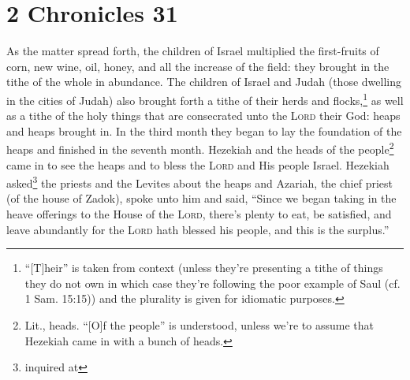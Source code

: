 \section{2 Chronicles 31}\label{2 Chronicles 31}
\begin{enumerate}[align=center]
     As the matter spread forth, the children of Israel multiplied the first-fruits of corn, new wine, oil, honey, and all the increase of the field: they brought in the tithe of the whole in abundance.%
     The children of Israel and Judah (those dwelling in the cities of Judah) also brought forth a tithe of their herds and flocks,\footnote{``[T]heir'' is taken from context (unless they're presenting a tithe of things they do not own in which case they're following the poor example of Saul (cf. 1 Sam. 15:15)) and the plurality is given for idiomatic purposes.} as well as a tithe of the holy things that are consecrated unto the \textsc{Lord} their God: heaps and heaps brought in.%
     In the third month they began to lay the foundation of the heaps and finished in the seventh month.%
     Hezekiah and the heads of the people\footnote{Lit., heads. ``[O]f the people'' is understood, unless we're to assume that Hezekiah came in with a bunch of heads.} came in to see the heaps and to bless the \textsc{Lord} and His people Israel.%
     Hezekiah asked\footnote{inquired at} the priests and the Levites about the heaps%
     and Azariah, the chief priest (of the house of Zadok), spoke unto him and said, ``Since we began taking in the heave offerings to the House of the \textsc{Lord}, there's plenty to eat, be satisfied, and leave abundantly for the \textsc{Lord} hath blessed his people, and this is the surplus.''%
\end{enumerate}
